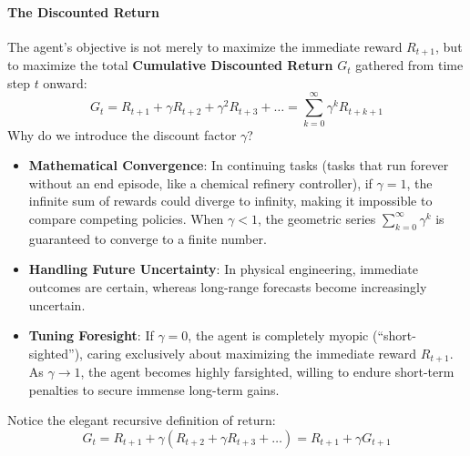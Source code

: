 \paragraph{The Discounted Return}
The agent's objective is not merely to maximize the immediate reward $R_{t+1}$, but to maximize the total \textbf{Cumulative Discounted Return} $G_t$ gathered from time step $t$ onward:
\begin{equation}
G_t = R_{t+1} + \gamma R_{t+2} + \gamma^2 R_{t+3} + \dots = \sum_{k=0}^{\infty} \gamma^k R_{t+k+1}\label{eq:discounted_return}
\end{equation}
Why do we introduce the discount factor $\gamma$?
\begin{itemize}
    \item \textbf{Mathematical Convergence}: In continuing tasks (tasks that run forever without an end episode, like a chemical refinery controller), if $\gamma = 1$, the infinite sum of rewards could diverge to infinity, making it impossible to compare competing policies. When $\gamma < 1$, the geometric series $\sum_{k=0}^\infty \gamma^k$ is guaranteed to converge to a finite number.
    \item \textbf{Handling Future Uncertainty}: In physical engineering, immediate outcomes are certain, whereas long-range forecasts become increasingly uncertain.
    \item \textbf{Tuning Foresight}: If $\gamma = 0$, the agent is completely myopic (``short-sighted''), caring exclusively about maximizing the immediate reward $R_{t+1}$. As $\gamma \to 1$, the agent becomes highly farsighted, willing to endure short-term penalties to secure immense long-term gains.
\end{itemize}
Notice the elegant recursive definition of return:
\begin{equation}
G_t = R_{t+1} + \gamma \left( R_{t+2} + \gamma R_{t+3} + \dots \right) = R_{t+1} + \gamma G_{t+1}\label{eq:recursive_return}
\end{equation}

